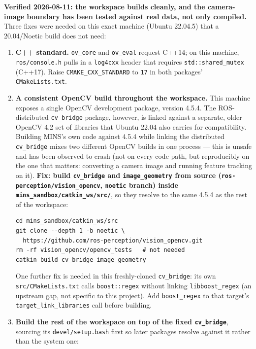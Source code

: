 \documentclass[11pt]{report}
\begin{document}
\textbf{Verified 2026-08-11: the workspace builds cleanly, and the
camera-image boundary has been tested against real data, not only compiled.}
Three fixes were needed on this exact machine (Ubuntu 22.04.5) that a
20.04/Noetic build does not need:

\begin{enumerate}
\item \textbf{C++ standard.} \texttt{ov\_core} and \texttt{ov\_eval} request
  C++14; on this machine, \texttt{ros/console.h} pulls in a \texttt{log4cxx}
  header that requires \texttt{std::shared\_mutex} (C++17). Raise
  \texttt{CMAKE\_CXX\_STANDARD} to \texttt{17} in both packages'
  \texttt{CMakeLists.txt}.
\item \textbf{A consistent OpenCV build throughout the workspace.} This
  machine exposes a single OpenCV development package, version 4.5.4. The
  ROS-distributed \texttt{cv\_bridge} package, however, is linked against a
  separate, older OpenCV 4.2 set of libraries that Ubuntu 22.04 also carries
  for compatibility. Building MINS's own code against 4.5.4 while linking
  the distributed \texttt{cv\_bridge} mixes two different OpenCV builds in
  one process --- this is unsafe and has been observed to crash (not on
  every code path, but reproducibly on the one that matters: converting a
  camera image and running feature tracking on it). \textbf{Fix: build
  \texttt{cv\_bridge} and \texttt{image\_geometry} from source
  (\texttt{ros-perception/vision\_opencv}, \texttt{noetic} branch) inside
  \texttt{mins\_sandbox/catkin\_ws/src/}}, so they resolve to the same 4.5.4
  as the rest of the workspace:
\begin{lstlisting}[style=shell]
cd mins_sandbox/catkin_ws/src
git clone --depth 1 -b noetic \
  https://github.com/ros-perception/vision_opencv.git
rm -rf vision_opencv/opencv_tests   # not needed
catkin build cv_bridge image_geometry
\end{lstlisting}
  One further fix is needed in this freshly-cloned \texttt{cv\_bridge}:
  its own \texttt{src/CMakeLists.txt} calls \texttt{boost::regex} without
  linking \texttt{libboost\_regex} (an upstream gap, not specific to this
  project). Add \texttt{boost\_regex} to that target's
  \texttt{target\_link\_libraries} call before building.
\item \textbf{Build the rest of the workspace on top of the fixed
  \texttt{cv\_bridge}}, sourcing its \texttt{devel/setup.bash} first so
  later packages resolve against it rather than the system one:
\begin{lstlisting}[style=shell]

\end{lstlisting}
\end{enumerate}
\end{document}
